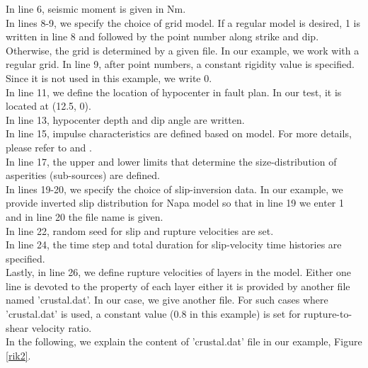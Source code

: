 In line 6, seismic moment is given in Nm. \\

In lines 8-9, we specify the choice of grid model. If a regular model is desired, 1 is written in line 8 and followed by the point number along strike and dip. Otherwise, the grid is determined by a given file. In our example, we work with a regular grid. In line 9, after point numbers, a constant rigidity value is specified. Since it is not used in this example, we write 0.  \\

In line 11, we define the location of hypocenter in fault plan. In our test, it is located at (12.5, 0). \\


In line 13, hypocenter depth and dip angle are written. \\


In line 15, impulse characteristics are defined based on \cite{Ruiz2011} model. For more details, please refer to \cite{Ruiz2011} and \cite{Gallovic2016}. \\


In line 17, the upper and lower limits that determine the size-distribution of asperities (sub-sources) are defined. \\

In lines 19-20, we specify the choice of slip-inversion data. In our example, we provide inverted slip distribution for Napa model so that in line 19 we enter 1 and in line 20 the file name is given. \\


In line 22, random seed for slip and rupture velocities are set. \\

In line 24, the time step and total duration for slip-velocity time histories are specified. \\

Lastly, in line 26, we define rupture velocities of layers in the model. Either one line is devoted to the property of each layer either it is provided by another file named 'crustal.dat'. In our case, we give another file. For such cases where 'crustal.dat' is used, a constant value (0.8 in this example) is set for rupture-to-shear velocity ratio. \\


In the following, we explain the content of 'crustal.dat' file in our example, Figure \ref{rik2}.



